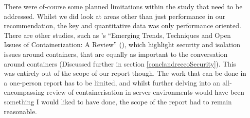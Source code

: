 There were of-course some planned limitations within the study that need to be addressed. Whilst we did look at areas other than just performance in our recommendation, the key and quantitative data was only performance oriented. There are other studies, such as \citeauthor{watanda19}'s “Emerging Trends, Techniques and Open Issues of Containerization: A Review” (\citeyear{watanda19}), which highlight security and isolation issues around containers, that are equally as important to the conversation around containers (Discussed further in section \ref{conclandreccoSecurity}). This was entirely out of the scope of our report though. The work that can be done in a one-person report has to be limited, and whilst further delving into an all-encompassing review of containerisation in server environments would have been something I would liked to have done, the scope of the report had to remain reasonable.




